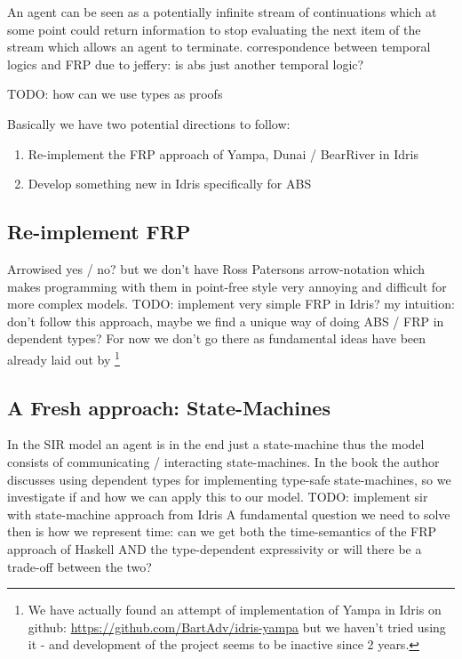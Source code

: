 An agent can be seen as a potentially infinite stream of continuations which at some point could return information to stop evaluating the next item of the stream which allows an agent to terminate.
correspondence between temporal logics and FRP due to jeffery: is abs just another temporal logic?

TODO: how can we use types as proofs

Basically we have two potential directions to follow:
\begin{enumerate}
	\item Re-implement the FRP approach of Yampa, Dunai / BearRiver in Idris
	\item Develop something new in Idris specifically for ABS
\end{enumerate}

\subsection{Re-implement FRP}
Arrowised yes / no? but we don't have Ross Patersons arrow-notation which makes programming with them in point-free style very annoying and difficult for more complex models.
TODO: implement very simple FRP in Idris?
my intuition: don't follow this approach, maybe we find a unique way of doing ABS / FRP in dependent types? For now we don't go there as fundamental ideas have been already laid out by \cite{sculthorpe_safe_2009} \footnote{We have actually found an attempt of implementation of Yampa in Idris on github: \url{https://github.com/BartAdv/idris-yampa} but we haven't tried using it - and development of the project seems to be inactive since 2 years.}

\subsection{A Fresh approach: State-Machines}
In the SIR model an agent is in the end just a state-machine thus the model consists of communicating / interacting state-machines. In the book \cite{brady_type-driven_2017} the author discusses using dependent types for implementing type-safe state-machines, so we investigate if and how we can apply this to our model.
TODO: implement sir with state-machine approach from Idris
A fundamental question we need to solve then is how we represent time: can we get both the time-semantics of the FRP approach of Haskell AND the type-dependent expressivity or will there be a trade-off between the two?